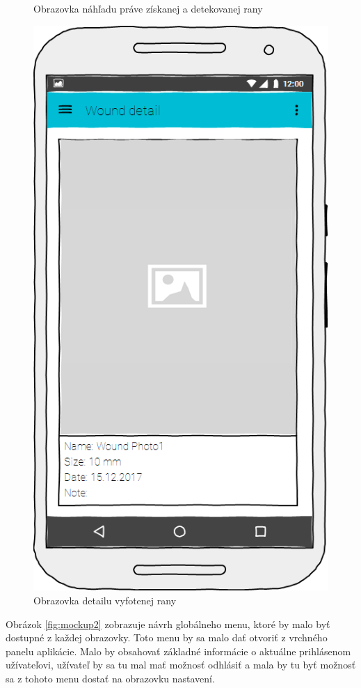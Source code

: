 \begin{figure}[h]
\begin{minipage}{0.48\textwidth}
      \caption{Obrazovka náhľadu práve získanej a detekovanej rany}
      \label{fig:mockup6}
   \end{minipage}\hfill
   \begin {minipage}{0.48\textwidth}
     \centering
     \includegraphics[scale=0.45]{fig/mockup7.png}
      \caption{Obrazovka detailu vyfotenej rany}
      \label{fig:mockup7}
   \end{minipage}
\end{figure}

Obrázok \ref{fig:mockup2} zobrazuje návrh globálneho menu, ktoré by malo byť dostupné z každej obrazovky. Toto menu by sa malo dať otvoriť z vrchného panelu aplikácie. Malo by obsahovať základné informácie o aktuálne prihlásenom užívateľovi, užívateľ by sa tu mal mať možnosť odhlásiť a mala by tu byť možnosť sa z tohoto menu dostať na obrazovku nastavení.
	
